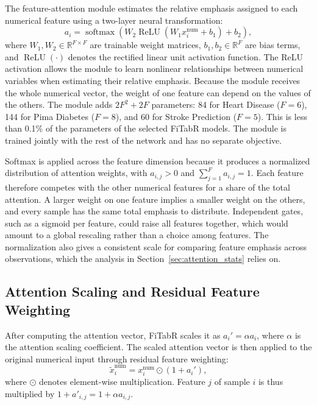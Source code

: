 \documentclass[11pt,a4paper,oneside, openany, reqno, chapter, nokorean]{oblivoir}
\theoremstyle{definition}
\theoremstyle{remark}
\numberwithin{equation}{chapter}
\theoremstyle{definition}
\theoremstyle{remark}
\theoremstyle{definition}
\begin{document}
The feature-attention module estimates the relative emphasis assigned to each
numerical feature using a two-layer neural transformation:
\begin{equation}
a_i =
\operatorname{softmax}
\left(
W_2 \operatorname{ReLU} \left(W_1 x_i^{\mathrm{num}} + b_1\right) + b_2
\right),
\label{eq:feature_attention}
\end{equation}
where $W_1,W_2\in\mathbb{R}^{F\times F}$ are trainable weight matrices,
$b_1,b_2\in\mathbb{R}^{F}$ are bias terms, and $\operatorname{ReLU}(\cdot)$
denotes the rectified linear unit activation function. The ReLU activation
allows the module to learn nonlinear relationships between numerical variables
when estimating their relative emphasis. Because the module receives the whole
numerical vector, the weight of one feature can depend on the values of the
others. The module adds $2F^2+2F$ parameters: 84 for Heart Disease ($F=6$),
144 for Pima Diabetes ($F=8$), and 60 for Stroke Prediction ($F=5$). This is
less than 0.1\% of the parameters of the selected FiTabR models. The module is
trained jointly with the rest of the network and has no separate objective.

Softmax is applied across the feature dimension because it produces a
normalized distribution of attention weights, with $a_{i,j}>0$ and
$\sum_{j=1}^{F}a_{i,j}=1$. Each feature therefore competes with the other
numerical features for a share of the total attention. A larger weight on one
feature implies a smaller weight on the others, and every sample has the same
total emphasis to distribute. Independent gates, such as a sigmoid per
feature, could raise all features together, which would amount to a global
rescaling rather than a choice among features. The normalization also gives a
consistent scale for comparing feature emphasis across observations, which the
analysis in Section~\ref{sec:attention_stats} relies on.

\subsection{Attention Scaling and Residual Feature Weighting}
\label{sec:residual}

After computing the attention vector, FiTabR scales it as $a_i' = \alpha a_i$,
where $\alpha$ is the attention scaling coefficient. The scaled attention
vector is then applied to the original numerical input through residual
feature weighting:
\begin{equation}
\tilde{x}_i^{\mathrm{num}}
=
x_i^{\mathrm{num}}
\odot
\left(1 + a_i'\right),
\label{eq:residual_feature_weighting}
\end{equation}
where $\odot$ denotes element-wise multiplication. Feature $j$ of sample $i$
is thus multiplied by $1+a'_{i,j}=1+\alpha a_{i,j}$.
\end{document}
